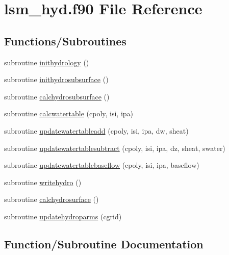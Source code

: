 \hypertarget{lsm__hyd_8f90}{}\section{lsm\+\_\+hyd.\+f90 File Reference}
\label{lsm__hyd_8f90}
\subsection*{Functions/\+Subroutines}
\begin{DoxyCompactItemize}
\item 
subroutine \hyperlink{lsm__hyd_8f90_a782dbf94a8fbff3af0292999a633c43b}{inithydrology} ()
\item 
subroutine \hyperlink{lsm__hyd_8f90_a1fa933dcc3dad40290d848768c45abd8}{inithydrosubsurface} ()
\item 
subroutine \hyperlink{lsm__hyd_8f90_abe537b030bd035365ddafa9a70f7ea70}{calchydrosubsurface} ()
\item 
subroutine \hyperlink{lsm__hyd_8f90_afd3fa007bbe0bf46fe255c1d82faf961}{calcwatertable} (cpoly, isi, ipa)
\item 
subroutine \hyperlink{lsm__hyd_8f90_a649e020c7927ecdc4adc5940c0fb9d51}{updatewatertableadd} (cpoly, isi, ipa, dw, sheat)
\item 
subroutine \hyperlink{lsm__hyd_8f90_a3e5df9616e3de35db8117e8911c3840d}{updatewatertablesubtract} (cpoly, isi, ipa, dz, sheat, swater)
\item 
subroutine \hyperlink{lsm__hyd_8f90_a1582265f309f944ad604c77437b388f6}{updatewatertablebaseflow} (cpoly, isi, ipa, baseflow)
\item 
subroutine \hyperlink{lsm__hyd_8f90_ae9efcba14d5b2614f82f49857a38876a}{writehydro} ()
\item 
subroutine \hyperlink{lsm__hyd_8f90_aa7ae1507aa34d41e254b41c13e67003f}{calchydrosurface} ()
\item 
subroutine \hyperlink{lsm__hyd_8f90_af30dd64ada375270557f3ec70fb3557c}{updatehydroparms} (cgrid)
\end{DoxyCompactItemize}


\subsection{Function/\+Subroutine Documentation}
\hypertarget{lsm__hyd_8f90_abe537b030bd035365ddafa9a70f7ea70}{}
